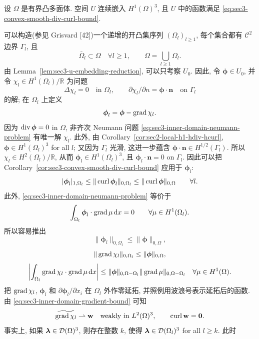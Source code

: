 \setcounter{statement}{8}
\begin{Theorem}\label{thm:sec3-convex-polyhedron-u-h1}
设 $\Omega$ 是有界凸多面体. 空间 $U$ 连续嵌入 $H^1(\Omega)^3$,
且 $U$ 中的函数满足 \eqref{eq:sec3-convex-smooth-div-curl-bound}.
\end{Theorem}
\begin{Proof}
可以构造(参见 Grisvard [42])一个递增的开凸集序列
$(\Omega_l)_{l\ge1}$, 每个集合都有 $\mathcal C^2$ 边界 $\Gamma_l$, 且
\[
\bar\Omega_l\subset\Omega\quad\forall l\ge1,
\qquad
\Omega=\bigcup_{l\ge1}\Omega_l.
\]
由 Lemma~\ref{lem:sec3-u-embedding-reduction}, 可以只考察 $U_0$.
因此, 令 $\boldsymbol\phi\in U_0$, 并令
$\chi_l\in H^1(\Omega_l)/\mathbb R$ 为问题
\begin{equation}\label{eq:sec3-inner-domain-neumann-problem}
\Delta\chi_l=0\quad\text{in }\Omega_l,
\qquad
\partial\chi_l/\partial n=\boldsymbol\phi\cdot\mathbf n
\quad\text{on }\Gamma_l
\end{equation}
的解; 在 $\Omega_l$ 上定义
\[
\boldsymbol\phi_l=\boldsymbol\phi-\operatorname{grad}\chi_l.
\]
因为 $\operatorname{div}\boldsymbol\phi=0$ in $\Omega$, 非齐次 Neumann 问题
\eqref{eq:sec3-inner-domain-neumann-problem} 有唯一解 $\chi_l$.
此外, 由 Corollary~\ref{cor:sec2-local-h1-hdiv-hcurl},
$\boldsymbol\phi\in H^1(\Omega_l)^3$ for all $l$; 又因为 $\Gamma_l$ 光滑,
这进一步蕴含 $\boldsymbol\phi\cdot\mathbf n\in H^{1/2}(\Gamma_l)$.
所以 $\chi_l\in H^2(\Omega_l)/\mathbb R$, 从而
$\boldsymbol\phi_l\in H^1(\Omega_l)^3$, 且
$\boldsymbol\phi_l\cdot\mathbf n=0$ on $\Gamma_l$.
因此可以把 Corollary~\ref{cor:sec3-convex-smooth-div-curl-bound} 应用于
$\boldsymbol\phi_l$:
\begin{equation}\label{eq:sec3-inner-domain-h1-bound}
|\boldsymbol\phi_l|_{1,\Omega_l}
\le\|\operatorname{curl}\boldsymbol\phi_l\|_{0,\Omega_l}
\le\|\operatorname{curl}\boldsymbol\phi\|_{0,\Omega}
\qquad\forall l.
\end{equation}
此外, \eqref{eq:sec3-inner-domain-neumann-problem} 等价于
\[
\int_{\Omega_l}\boldsymbol\phi_l\cdot\operatorname{grad}\mu\,\mathrm{d} x=0
\qquad\forall\mu\in H^1(\Omega_l).
\]
所以容易推出
\begin{equation}\label{eq:sec3-inner-domain-l2-bound}
\|\boldsymbol\phi_l\|_{0,\Omega_l}
\le\|\boldsymbol\phi\|_{0,\Omega},
\end{equation}
\begin{equation}\label{eq:sec3-inner-domain-gradient-bound}
\|\operatorname{grad}\chi_l\|_{0,\Omega_l}
\le\|\boldsymbol\phi\|_{0,\Omega},
\end{equation}
\begin{equation}\label{eq:sec3-inner-domain-gradient-test-bound}
\left|\int_{\Omega_l}\operatorname{grad}\chi_l\cdot\operatorname{grad}\mu\,\mathrm{d} x\right|
\le\|\boldsymbol\phi\|_{0,\Omega-\Omega_l}
\|\operatorname{grad}\mu\|_{0,\Omega-\Omega_l}
\quad\forall\mu\in H^1(\Omega).
\end{equation}
把 $\operatorname{grad}\chi_l$, $\boldsymbol\phi_l$ 和
$\partial\boldsymbol\phi_l/\partial x_i$ 在 $\Omega_l$ 外作零延拓, 并照例用波浪号表示延拓后的函数.
由 \eqref{eq:sec3-inner-domain-gradient-bound} 可知
\[
\widetilde{\operatorname{grad}\chi_l}\rightharpoonup\mathbf w
\quad\text{weakly in }L^2(\Omega)^3,
\qquad
\operatorname{curl}\mathbf w=\mathbf0.
\]
事实上, 如果 $\boldsymbol\lambda\in\mathcal{D}(\Omega)^3$, 则存在整数 $k$, 使得
$\boldsymbol\lambda\in\mathcal{D}(\Omega_l)^3$ for all $l\ge k$. 此时


\end{Proof}
